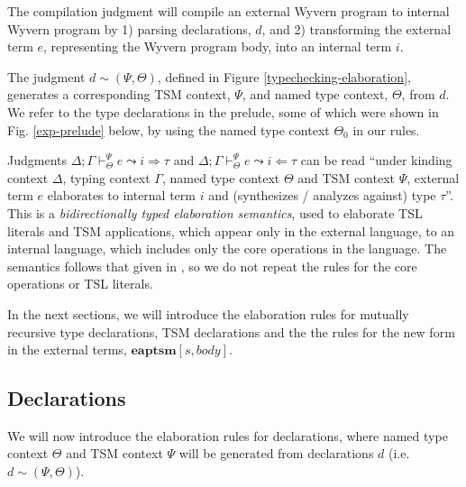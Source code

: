 The compilation judgment will compile an external Wyvern program to internal Wyvern program by 1) parsing declarations, $d$, and 2) transforming the external term $e$, representing the Wyvern program body, into an internal term $i$.

The judgment $d \sim (\Psi, \Theta)$, defined in Figure \ref{typechecking-elaboration}, generates a corresponding TSM context, $\Psi$, and named type context, $\Theta$, from $d$. We refer to the type declarations in the prelude, some of which were shown in Fig. \ref{exp-prelude} below, by using the named type context $\Theta_0$ in our rules.




Judgments $\Delta; \Gamma \vdash_\Theta^\Psi e \leadsto i \Rightarrow \tau$ and  $\Delta; \Gamma \vdash_\Theta^\Psi e \leadsto i \Leftarrow \tau$ can be read ``under kinding context $\Delta$, typing context $\Gamma$, named type context $\Theta$ and TSM context $\Psi$, external term $e$ elaborates to internal term $i$ and (synthesizes / analyzes against) type $\tau$''. This is a \emph{bidirectionally typed elaboration semantics}, used to elaborate TSL literals and TSM applications, which appear only in the external language, to an internal language, which includes only the core operations in the language. The semantics follows that given in \cite{TSLs}, so we do not repeat the rules for the core operations or TSL literals. 

In the next sections, we will introduce the elaboration rules for mutually recursive type declarations, TSM declarations and the the rules for the new form in the external terms, $\textbf{eaptsm}[s, body]$.

\subsection{Declarations}
We will now introduce the elaboration rules for declarations, where named type context $\Theta$ and TSM context $\Psi$ will be generated from declarations $d$ (i.e. $d \sim (\Psi, \Theta)$). 

